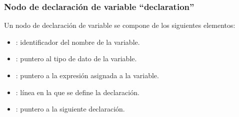 \subsubsection{Nodo de declaración de variable ``declaration''}
\noindent
Un nodo de declaración de variable se compone de los siguientes elementos:
\begin{itemize}
    \item {} : identificador del nombre de la variable.
    \item {} : puntero al tipo de dato de la variable.
    \item {} : puntero a la expresión asignada a la variable.
    \item {} : línea en la que se define la declaración.
    \item {} : puntero a la siguiente declaración.
\end{itemize}

